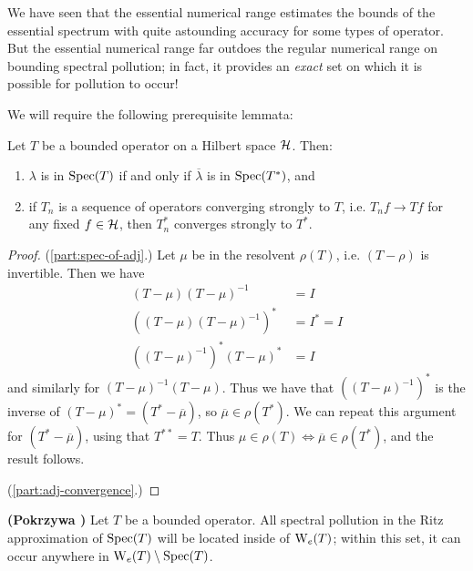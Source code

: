 \documentclass[../main.tex]{subfiles}
\begin{document}
We have seen that the essential numerical range estimates the bounds of the
essential spectrum with quite astounding accuracy for some types of operator.
But the essential numerical range far outdoes the regular numerical range on
bounding spectral pollution; in fact, it provides an \emph{exact} set on which
it is possible for pollution to occur! 

We will require the following prerequisite lemmata:
\begin{lemma}\label{thm:adjoint-spec-props}
  Let $T$ be a bounded operator on a Hilbert space $\mathcal{H}$. Then:
  \begin{enumerate}
  \item
  \label{part:spec-of-adj}
    $\lambda$ is in $\mathrm{Spec}(T)$ if and only if $\overline{\lambda}$ is in $\mathrm{Spec}(T^*)$, and
  \item
  \label{part:adj-convergence}
    if $T_n$ is a sequence of operators converging strongly to $T$, i.e. $T_n f
    \rightarrow Tf$ for any fixed $f \in \mathcal{H}$, then $T_n^*$ converges
    strongly to $T^*$.
  \end{enumerate}
\end{lemma}
\begin{proof}
(\ref{part:spec-of-adj}.) Let $\mu$ be in the resolvent $\rho(T)$,
i.e. $(T - \rho)$ is invertible. Then we have
\begin{align*}
(T - \mu)(T - \mu)^{-1} & = I \\
((T - \mu)(T - \mu)^{-1})^* & = I^* = I \\
((T - \mu)^{-1})^*(T - \mu)^* & = I
\end{align*}
and similarly for $(T - \mu)^{-1}(T - \mu)$. Thus we have that 
$((T - \mu)^{-1})^*$ is the inverse of $(T - \mu)^* = (T^* - \overline{\mu})$,
so $\overline{\mu} \in \rho(T^*)$. We can repeat this argument for 
$(T^* - \overline{\mu})$, using that $T^{**} = T$. Thus $\mu \in \rho(T)
\Leftrightarrow \overline{\mu} \in \rho(T^*)$, and the result follows.

(\ref{part:adj-convergence}.) %
\end{proof}

\begin{theorem}{\textbf{(Pokrzywa \cite{pokrzywa1979method})}}
  Let $T$ be a bounded operator. All spectral pollution in the Ritz approximation
  of $\mathrm{Spec}(T)$ will be located inside of $\mathrm{W}_e(T)$; within this set, it can
  occur anywhere in $\mathrm{W}_e(T) \setminus \mathrm{Spec}(T)$.
\end{theorem}
\end{document}

